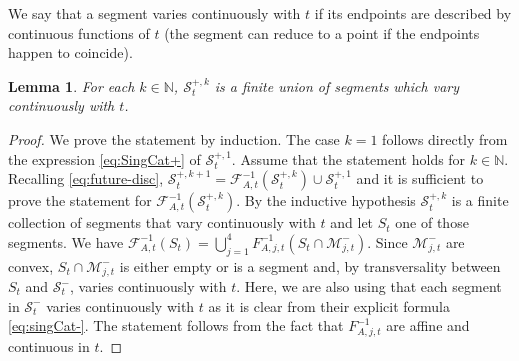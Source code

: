 \documentclass{amsart}
\numberwithin{equation}{section}
\newtheorem{lemma}[theorem]{Lemma}
\newcommand\cF{{\mathcal F}}
\newcommand\cM{{\mathcal M}}
\newcommand\cS{{\mathcal S}}
\newcommand\bN{{\mathbb N}}
\newcommand{\catt}{\cF_{A,t}}
\newcommand{\catjt}{F_{A,j,t}}
\begin{document}
We say that a segment varies continuously with \(t\) if its endpoints are described by continuous functions of \(t\) (the segment can reduce to a point if the endpoints happen to coincide).

\begin{lemma}\label{lem:continuity-sing-set}
For each \(k \in \bN\), \(\cS_t^{+,k}\) is a finite union of segments which vary continuously with \(t\).
\end{lemma}
\begin{proof}
We prove the statement by induction. The case \(k = 1\) follows directly from the expression \eqref{eq:SingCat+} of \(\cS_t^{+,1}\). Assume that the statement holds for \(k \in \bN\). Recalling \eqref{eq:future-disc}, \(\cS_{t}^{+,k+1} = \catt^{-1}(\cS_t^{+,k}) \cup \cS_t^{+,1}\) and it is sufficient to prove the statement for \(\catt^{-1}(\cS_t^{+,k})\). By the inductive hypothesis \(\cS_t^{+,k}\) is a finite collection of segments that vary continuously with \(t\) and let \(S_t\) one of those segments. We have \(\catt^{-1}(S_t) = \bigcup_{j =1}^4 \catjt^{-1}(S_t \cap \cM_{j,t}^{-})\). Since \(\cM_{j,t}^{-}\) are convex, \(S_t \cap \cM_{j,t}^{-}\) is either empty or is a segment and, by transversality between \(S_t\) and \(\cS_t^{-}\), varies continuously with \(t\). Here, we are also using that each segment in \(\cS_t^{-}\) varies continuously with \(t\) as it is clear from their explicit formula \eqref{eq:singCat-}.
The statement follows from the fact that  \(\catjt^{-1}\) are affine and continuous in \(t\).
\end{proof}
\end{document}
